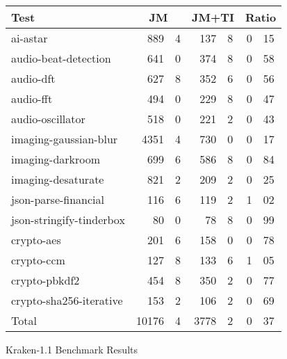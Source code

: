 \begin{figure}
\begin{center}
\begin{tabular}{lr@{.}lr@{.}lr@{.}l}

\toprule

Test & \multicolumn{2}{c}{JM}
     & \multicolumn{2}{c}{JM+TI}
     & \multicolumn{2}{c}{Ratio} \\

\midrule

ai-astar & 889&4 & 137&8 & 0&15 \\
audio-beat-detection & 641&0 & 374&8 & 0&58 \\
audio-dft & 627&8 & 352&6 & 0&56 \\
audio-fft & 494&0 & 229&8 & 0&47 \\
audio-oscillator & 518&0 & 221&2 & 0&43 \\
imaging-gaussian-blur & 4351&4 & 730&0 & 0&17 \\
imaging-darkroom & 699&6 & 586&8 & 0&84 \\
imaging-desaturate & 821&2 & 209&2 & 0&25 \\
json-parse-financial & 116&6 & 119&2 & 1&02 \\
json-stringify-tinderbox & 80&0 & 78&8 & 0&99 \\
crypto-aes & 201&6 & 158&0 & 0&78 \\
crypto-ccm & 127&8 & 133&6 & 1&05 \\
crypto-pbkdf2 & 454&8 & 350&2 & 0&77 \\
crypto-sha256-iterative & 153&2 & 106&2 & 0&69 \\
\midrule
Total & 10176&4 & 3778&2 & 0&37 \\
\bottomrule
\end{tabular}
\end{center}
\nocaptionrule \caption{Kraken-1.1 Benchmark Results}
\label{fig:kraken}
\end{figure}

